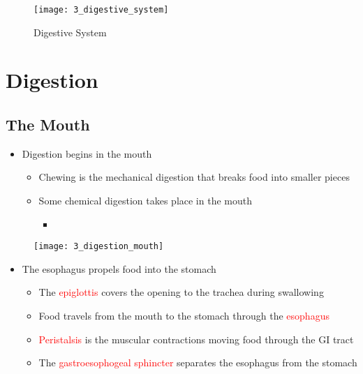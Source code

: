 \documentclass[title={Chapter 3}]{fdsn201notes}
\begin{document}
\begin{figure}[H]
	\centering
	\texttt{[image: 3\_digestive\_system]}
	\caption{Digestive System}
	\label{fig:digestive-system}
\end{figure}

\section{Digestion}\label{sec:digestion}
\subsection{The Mouth}\label{subsec:digestion-the-mouth}
\begin{itemize}
	\item Digestion begins in the mouth
	\begin{itemize}
		\item Chewing is the mechanical digestion that breaks food into smaller pieces
		\item Some chemical digestion takes place in the mouth
		\begin{itemize}
			\item {}
		\end{itemize}
	\end{itemize}
\end{itemize}

\begin{figure}[H]
	\centering
	\texttt{[image: 3\_digestion\_mouth]}
	\caption{}
	\label{fig:digestion-mouth}
\end{figure}

\begin{itemize}
	\item The esophagus propels food into the stomach
	\begin{itemize}
		\item The \textcolor{red}{epiglottis} covers the opening to the trachea during swallowing
		\item Food travels from the mouth to the stomach through the \textcolor{red}{esophagus}
		\item \textcolor{red}{Peristalsis} is the muscular contractions moving food through the GI tract
		\item The \textcolor{red}{gastroesophogeal sphincter} separates the esophagus from the stomach
	\end{itemize}
\end{itemize}
\end{document}
